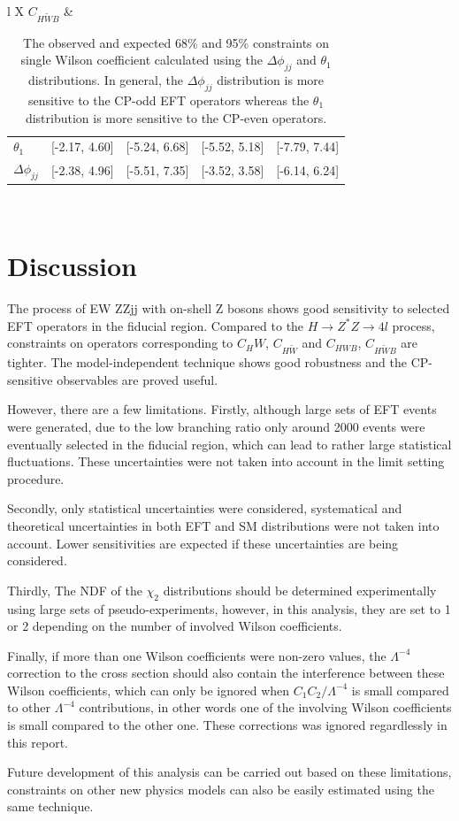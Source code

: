 \documentclass[a4paper,12pt]{article}
\begin{document}
\begin{table}[ht!]
\begin{tabularx}{\textwidth}{l X}
			\hline
			$C_{H\tilde{W}B}$   & {\begin{tabularx}{0.9\textwidth}{X X X X X}$\theta_1$			& [-2.17, 4.60]			& [-5.24, 6.68]		& [-5.52, 5.18] 	& [-7.79, 7.44] \\
															$\Delta\phi_{jj}$	& [-2.38, 4.96]			& [-5.51, 7.35]		& [-3.52, 3.58]   	& [-6.14, 6.24] \end{tabularx}}	\\
			\hline\hline
			\end{tabularx}
			\caption{The observed and expected 68\% and 95\% constraints on single Wilson coefficient calculated using the $\Delta\phi_{jj}$ and $\theta_1$ distributions. In general,
			the $\Delta\phi_{jj}$ distribution is more sensitive to the CP-odd EFT operators whereas the $\theta_1$ distribution is more sensitive to the CP-even operators.}
			\label{tab:limit}
		\end{table}
	\section{Discussion}
		\par The process of EW ZZjj with on-shell Z bosons shows good sensitivity to selected EFT operators in the fiducial region.
		Compared to the $H\rightarrow Z^{*}Z\rightarrow 4l$ process\cite{Bernlochner_2019}, constraints on operators corresponding 
		to $C_HW$, $C_{H\tilde{W}}$ and $C_{HWB}$, $C_{H\tilde{W}B}$ are tighter. The model-independent technique shows good 
		robustness and the CP-sensitive observables are proved useful.
		\par However, there are a few limitations.
		Firstly, although large sets of EFT events were generated, due to the low branching
		ratio only around 2000 events were eventually selected in the fiducial region, which can lead to rather large statistical 
		fluctuations. These uncertainties were not taken into account in the limit setting procedure.
		
		Secondly, only statistical uncertainties were considered, systematical and theoretical uncertainties in both EFT and SM 
		distributions were not taken into account. Lower sensitivities are expected if these uncertainties are being considered.
		
		Thirdly, The NDF of the $\chi_2$ distributions should be determined experimentally using large sets of pseudo-experiments, 
		however, in this analysis, they are set to 1 or 2 depending on the number of involved Wilson coefficients.

		Finally, if more than one Wilson coefficients were non-zero values, the $\Lambda^{-4}$ correction to the cross section
		should also contain the interference between these Wilson coefficients, which can only be ignored when 
		$C_1C_2/\Lambda^{-4}$ is small compared to other $\Lambda^{-4}$ contributions, in other words one of the involving 
		Wilson coefficients is small compared to the other one. These corrections was ignored regardlessly in this report.
		\par Future development of this analysis can be carried out based on these limitations, constraints on other new 
		physics models can also be easily estimated using the same technique. 

	\clearpage
	
	
\end{document}
